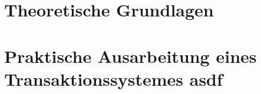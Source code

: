 




\frenchspacing
\raggedbottom
{} %
\pagestyle{plain}

\condTWOSIDE{}
\cleardoublepage
\condLOCK{\cleardoublepage}
\condDOUBLESPACING{\onehalfspacing}
\cleardoublepage
\cleardoublepage
\pagestyle{scrheadings}
\cleardoublepage
\cleardoublepage
\cleardoublepage
\cleardoublepage
\cleardoublepage
\setcounter{page}{1}
\cleardoublepage\part{Theoretische Grundlagen}




\cleardoublepage\part{Praktische Ausarbeitung eines Transaktionssystemes asdf}

\appendix

%

\cleardoublepage

